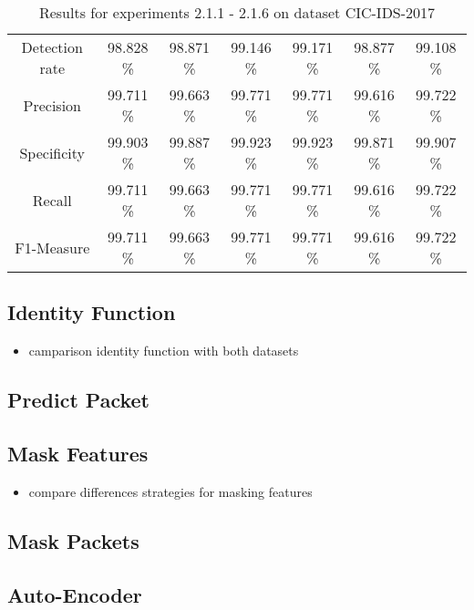 \begin{table}[htb]
{\begin{tabular}{@{}ccccccc@{}}
		Detection rate &  98.828 \% &  98.871 \% &  99.146 \% &  99.171 \% &  98.877 \% &  99.108 \% \\
		Precision &  99.711 \% &  99.663 \% &  99.771 \% &  99.771 \% &  99.616 \% &  99.722 \% \\
		Specificity &  99.903 \% &  99.887 \% &  99.923 \% &  99.923 \% &  99.871 \% &  99.907 \% \\
		Recall &  99.711 \% &  99.663 \% &  99.771 \% &  99.771 \% &  99.616 \% &  99.722 \% \\
		F1-Measure &  99.711 \% &  99.663 \% &  99.771 \% &  99.771 \% &  99.616 \% &  99.722 \% \\
		\bottomrule
	\end{tabular}}
	\caption{Results for experiments 2.1.1 - 2.1.6 on dataset CIC-IDS-2017}
\end{table}


\subsection{Identity Function} \label{sec:results:lstm:identity}

\begin{itemize}
	\item camparison identity function with both datasets 
\end{itemize} 

\subsection{Predict Packet} \label{sec:results:lstm:predict_packet}

\subsection{Mask Features} \label{sec:results:lstm:mask_feature}

\begin{itemize}
	\item compare differences strategies for masking features
\end{itemize} 

\subsection{Mask Packets} \label{sec:results:lstm:mask_packet}

\subsection{Auto-Encoder} \label{sec:results:lstm:auto_encoder}

